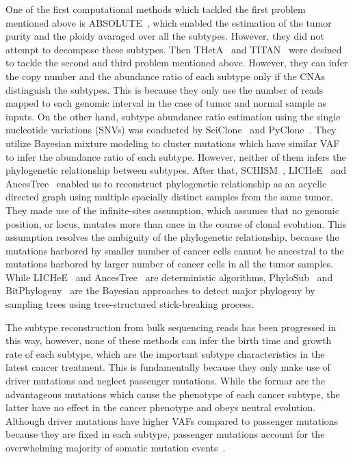 \documentclass{article}
\begin{document}
One of the first computational methods which tackled the first problem mentioned above is ABSOLUTE~\cite{carter2012absolute}, which enabled the estimation of the tumor purity and the ploidy avaraged over all the subtypes.
However, they did not attempt to decompose these subtypes.
Then THetA~\cite{williams2016identification} and TITAN~\cite{ha2014titan} were desined to tackle the second and third problem mentioned above.
However, they can infer the copy number and the abundance ratio of each subtype only if the CNAs distinguish the subtypes.%
This is because they only use the number of reads mapped to each genomic interval in the case of tumor and normal sample as inputs.
On the other hand, subtype abundance ratio estimation using the single nucleotide variations (SNVs) was conducted by SciClone~\cite{miller2014sciclone} and PyClone~\cite{roth2014pyclone}.
They utilize Bayesian mixture modeling to cluster mutations which have similar VAF to infer the abundance ratio of each subtype.
However, neither of them infers the phylogenetic relationship between subtypes.
After that, SCHISM~\cite{niknafs2015subclonal}, LICHeE~\cite{popic2015fast} and AncesTree~\cite{el2015reconstruction} enabled us to reconstruct phylogenetic relationship as an acyclic directed graph using multiple spacially distinct samples from the same tumor.
They made use of the infinite-sites assumption, which assumes that no genomic position, or locus, mutates more than once in the course of clonal evolution.
This assumption resolves the ambiguity of the phylogenetic relationship, because the mutations harbored by smaller number of cancer cells cannot be ancestral to the mutations harbored by larger number of cancer cells in all the tumor samples.
While LICHeE~\cite{popic2015fast} and AncesTree~\cite{el2015reconstruction} are deterministic algorithms, PhyloSub~\cite{jiao2014inferring} and BitPhylogeny~\cite{yuan2015bitphylogeny} are the Bayesian approaches to detect major phylogeny by sampling trees using tree-structured stick-breaking process.

The subtype reconstruction from bulk sequencing reads has been progressed in this way, however, none of these methods can infer the birth time and growth rate of each subtype, which are the important subtype characteristics in the latest cancer treatment.
This is fundamentally because they only make use of driver mutations and neglect passenger mutations.
While the formar are the advantageous mutations which cause the phenotype of each cancer subtype, the latter have no effect in the cancer phenotype and obeys neutral evolution.
Although driver mutations have higher VAFs compared to passenger mutations because they are fixed in each subtype,
passenger mutations account for the overwhelming majority of somatic mutation events~\cite{bozic2010accumulation}.
\end{document}
